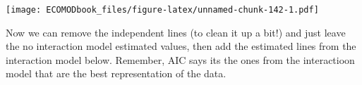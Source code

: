 \documentclass[
]{book}
\newenvironment{Shaded}{\begin{snugshade}}{\end{snugshade}}
\newcommand{\DataTypeTok}[1]{\textcolor[rgb]{0.13,0.29,0.53}{#1}}
\newcommand{\DecValTok}[1]{\textcolor[rgb]{0.00,0.00,0.81}{#1}}
\newcommand{\KeywordTok}[1]{\textcolor[rgb]{0.13,0.29,0.53}{\textbf{#1}}}
\newcommand{\NormalTok}[1]{#1}
\newcommand{\OperatorTok}[1]{\textcolor[rgb]{0.81,0.36,0.00}{\textbf{#1}}}
\begin{document}
\begin{Shaded}
\end{Shaded}

\texttt{[image: ECOMODbook\_files/figure-latex/unnamed-chunk-142-1.pdf]}

Now we can remove the independent lines (to clean it up a bit!) and just leave the no interaction model estimated values, then add the estimated lines from the interaction model below. Remember, AIC says its the ones from the interactioon model that are the best representation of the data.
\end{document}
